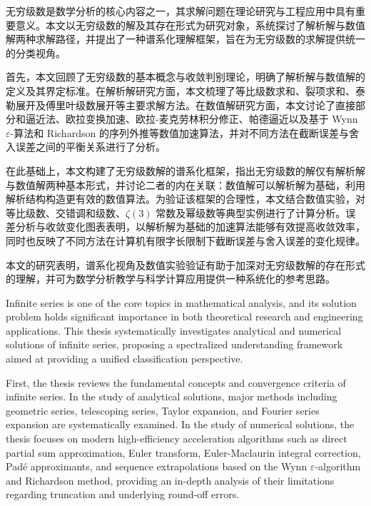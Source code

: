 
\cnabstract

无穷级数是数学分析的核心内容之一，其求解问题在理论研究与工程应用中具有重要意义。本文以无穷级数的解及其存在形式为研究对象，系统探讨了解析解与数值解两种求解路径，并提出了一种谱系化理解框架，旨在为无穷级数的求解提供统一的分类视角。

首先，本文回顾了无穷级数的基本概念与收敛判别理论，明确了解析解与数值解的定义及其界定标准。在解析解研究方面，本文梳理了等比级数求和、裂项求和、泰勒展开及傅里叶级数展开等主要求解方法。在数值解研究方面，本文讨论了直接部分和逼近法、欧拉变换加速、欧拉-麦克劳林积分修正、帕德逼近以及基于 Wynn $\varepsilon$-算法和 Richardson 的序列外推等数值加速算法，并对不同方法在截断误差与舍入误差之间的平衡关系进行了分析。

在此基础上，本文构建了无穷级数解的谱系化框架，指出无穷级数的解仅有解析解与数值解两种基本形式，并讨论二者的内在关联：数值解可以解析解为基础，利用解析结构构造更有效的数值算法。为验证该框架的合理性，本文结合数值实验，对等比级数、交错调和级数、$\zeta(3)$ 常数及幂级数等典型实例进行了计算分析。误差分析与收敛变化图表表明，以解析解为基础的加速算法能够有效提高收敛效率，同时也反映了不同方法在计算机有限字长限制下截断误差与舍入误差的变化规律。

本文的研究表明，谱系化视角及数值实验验证有助于加深对无穷级数解的存在形式的理解，并可为数学分析教学与科学计算应用提供一种系统化的参考思路。


\enabstract

Infinite series is one of the core topics in mathematical analysis, and its solution problem holds significant importance in both theoretical research and engineering applications. This thesis systematically investigates analytical and numerical solutions of infinite series, proposing a spectralized understanding framework aimed at providing a unified classification perspective.

First, the thesis reviews the fundamental concepts and convergence criteria of infinite series. In the study of analytical solutions, major methods including geometric series, telescoping series, Taylor expansion, and Fourier series expansion are systematically examined. In the study of numerical solutions, the thesis focuses on modern high-efficiency acceleration algorithms such as direct partial sum approximation, Euler transform, Euler-Maclaurin integral correction, Padé approximants, and sequence extrapolations based on the Wynn $\varepsilon$-algorithm and Richardson method, providing an in-depth analysis of their limitations regarding truncation and underlying round-off errors.

